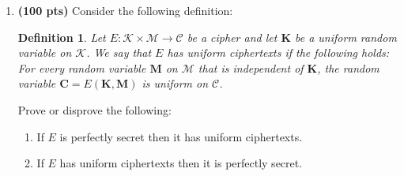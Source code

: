 \documentclass[11pt]{article}
\newtheorem{definition}{Definition}
\newcommand{\bK}{\mathbf{K}}
\newcommand{\bM}{\mathbf{M}}
\newcommand{\bC}{\mathbf{C}}
\newcommand{\msgs}{\mathcal{M}}
\newcommand{\ctxts}{\mathcal{C}}
\newcommand{\points}[1]{\textbf{({#1} pts)}}
\newcommand{\keys}{\mathcal{K}}
\begin{document}
\begin{enumerate}
\item \points{100} Consider the following definition:
        
             \begin{definition} 
                 Let $E:\keys\times\msgs\to\ctxts$ be a cipher and let $\bK$ be
                 a uniform random variable on $\keys$.  We say that $E$ has
                 \emph{uniform ciphertexts} if the following holds: For every
                 random variable $\bM$ on $\msgs$ that is independent of $\bK$,
                 the random variable $\bC = E(\bK,\bM)$ is uniform on $\ctxts$.
             \end{definition}

                    Prove or disprove the following:
        \begin{enumerate}
            \item If $E$ is perfectly secret then it has uniform ciphertexts.
            \item If $E$ has uniform ciphertexts then it is perfectly secret.
        \end{enumerate}

\end{enumerate}
\end{document}
